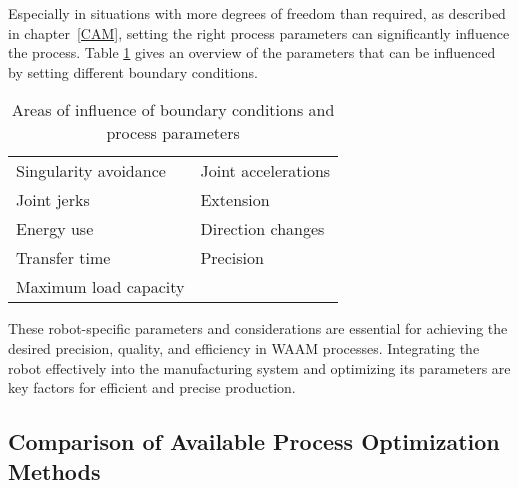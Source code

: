 \documentclass[ZLstudentexpose%
              ,optBiber%
              ,optEnglish%
              ,10pt
              ]{ZLlatex}%
\begin{document}
Especially in situations with more degrees of freedom than required, as described in chapter~\ref{CAM}, setting the right process parameters can significantly influence the process.
Table \ref{parameter} gives an overview of the parameters that can be influenced by setting different boundary conditions.

\begin{table} [h!]
\centering
\begin{tabular}{|l|l|}
\hline
\hline
Singularity avoidance \cite{Huo.2008b} & Joint accelerations \cite{Gasparetto.2010}\\
Joint jerks \cite{Gasparetto.2010} & Extension \\
Energy use \cite{Paryanto.2015} & Direction changes \cite{Halbauer.2013}\\
Transfer time \cite{Hirzinger.2005} & Precision \cite{Pham.2018}\\
Maximum load capacity \cite{Breaz.2017} & \\
\hline
\hline

\end{tabular}


\caption{Areas of influence of boundary conditions and process parameters}
\label{parameter}
\end{table}

These robot-specific parameters and considerations are essential for achieving the desired precision, quality, and efficiency in WAAM processes. Integrating the robot effectively into the manufacturing system and optimizing its parameters are key factors for efficient and precise production.
\newpage
\subsection{Comparison of Available Process Optimization Methods}
\end{document}
